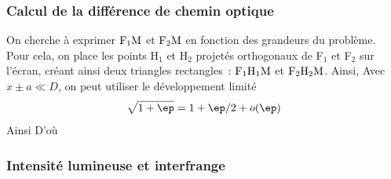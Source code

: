 \documentclass[../../main/main.tex]{subfiles}
\begin{document}
\subsubsection{Calcul de la différence de chemin optique}
On cherche à exprimer $\rm F_1M$ et $\rm F_2M$ en fonction des grandeurs du
problème. Pour cela, on place les points H$_1$ et H$_2$ projetés orthogonaux de
F$_1$ et F$_2$ sur l'écran, créant ainsi deux triangles rectangles~: $\rm
	F_1H_1M$ et $\rm F_2H_2M$. Ainsi,
Avec $x\pm a \ll D$, on peut utiliser le développement limité
\[\sqrt{1+\ep} = 1 + \ep/2 + o(\ep)\]
Ainsi
\vspace*{-24pt}
\vspace{-10pt}
D'où
\vspace*{-20pt}
\vspace{-10pt}

\subsubsection{Intensité lumineuse et interfrange}
\end{document}
